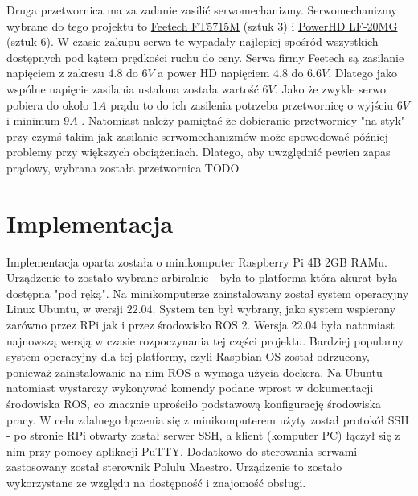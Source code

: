 \documentclass[a4paper,13pt]{article}
\begin{document}
Druga przetwornica ma za zadanie zasilić serwomechanizmy. Serwomechanizmy wybrane do tego projektu to \href{https://botland.com.pl/serwa-typu-standard/9182-serwo-feetech-ft5715m-standard-5904422312756.html}{Feetech FT5715M} (sztuk 3) i \href{https://botland.com.pl/serwa-typu-standard/3576-serwo-powerhd-lf-20mg-standard-6939670200387.html}{PowerHD LF-20MG} (sztuk 6). W czasie zakupu serwa te wypadały najlepiej spośród wszystkich dostępnych pod kątem prędkości ruchu do ceny. Serwa firmy Feetech są zasilanie napięciem z zakresu $4.8$ do $6V$ a power HD napięciem $4.8$ do $6.6V$. Dlatego jako wspólne napięcie zasilania ustalona została wartość $6V$. Jako że zwykle serwo pobiera do około $1A$ prądu to do ich zasilenia potrzeba przetwornicę o wyjściu $6V$ i minimum $9A$ \cite{Servo_power_sup}. Natomiast należy pamiętać że dobieranie przetwornicy "na styk" przy czymś takim jak zasilanie serwomechanizmów może spowodować później problemy przy większych obciążeniach. Dlatego, aby uwzględnić pewien zapas prądowy, wybrana została przetwornica TODO


\section{Implementacja}
Implementacja oparta została o minikomputer Raspberry Pi 4B 2GB RAMu. Urządzenie to zostało wybrane arbiralnie - była to platforma która akurat była dostępna "pod ręką". Na minikomputerze zainstalowany został system operacyjny Linux Ubuntu, w wersji $22.04$. System ten był wybrany, jako system wspierany zarówno przez RPi jak i przez środowisko ROS 2. Wersja 22.04 była natomiast najnowszą wersją w czasie rozpoczynania tej części projektu. Bardziej popularny system operacyjny dla tej platformy, czyli Raspbian OS został odrzucony, ponieważ zainstalowanie na nim ROS-a wymaga użycia dockera. Na Ubuntu natomiast wystarczy wykonywać komendy podane wprost w dokumentacji środowiska ROS, co znacznie uprościło podstawową konfigurację środowiska pracy. W celu zdalnego łączenia się z minikomputerem użyty został protokół SSH - po stronie RPi otwarty został serwer SSH, a klient (komputer PC) łączył się z nim przy pomocy aplikacji PuTTY. Dodatkowo do sterowania serwami zastosowany został sterownik Polulu Maestro. Urządzenie to zostało wykorzystane ze względu na dostępność i znajomość obsługi.
\end{document}
